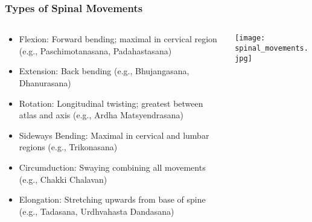\begin{frame}[fragile]\frametitle{Types of Spinal Movements}
\begin{columns}
    \begin{column}[T]{0.5\linewidth}
      \begin{itemize}
		\item Flexion: Forward bending; maximal in cervical region (e.g., Paschimotanasana, Padahastasana)
		\item Extension: Back bending (e.g., Bhujangasana, Dhanurasana)
		\item Rotation: Longitudinal twisting; greatest between atlas and axis (e.g., Ardha Matsyendrasana)
		\item Sideways Bending: Maximal in cervical and lumbar regions (e.g., Trikonasana)
		\item Circumduction: Swaying combining all movements (e.g., Chakki Chalavan)
		\item Elongation: Stretching upwards from base of spine (e.g., Tadasana, Urdhvahasta Dandasana)
	  \end{itemize}
    \end{column}
    \begin{column}[T]{0.5\linewidth}
		\begin{center}
		\texttt{[image: spinal\_movements.jpg]} 
		\end{center}	
    \end{column}
  \end{columns}
\end{frame}

